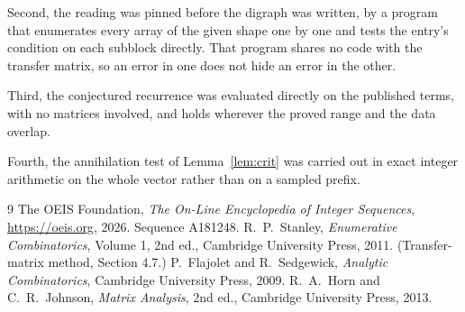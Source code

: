 \documentclass[11pt,a4paper]{article}
\theoremstyle{plain}
\theoremstyle{definition}
\begin{document}
Second, the reading was pinned before the digraph was written, by a program that enumerates
every array of the given shape one by one and tests the entry's condition on each subblock
directly. That program shares no code with the transfer matrix, so an error in one does not
hide an error in the other.

Third, the conjectured recurrence was evaluated directly on the published terms, with no
matrices involved, and holds wherever the proved range and the data overlap.

Fourth, the annihilation test of Lemma~\ref{lem:crit} was carried out in exact integer
arithmetic on the whole vector rather than on a sampled prefix.

\begin{thebibliography}{9}
 The OEIS Foundation, \emph{The On-Line Encyclopedia of Integer
Sequences}, \url{https://oeis.org}, 2026. Sequence A181248.
 R.~P.~Stanley, \emph{Enumerative Combinatorics}, Volume 1, 2nd ed.,
Cambridge University Press, 2011. (Transfer-matrix method, Section 4.7.)
 P.~Flajolet and R.~Sedgewick, \emph{Analytic Combinatorics}, Cambridge
University Press, 2009.
 R.~A.~Horn and C.~R.~Johnson, \emph{Matrix Analysis}, 2nd ed., Cambridge
University Press, 2013.
\end{thebibliography}
\end{document}

